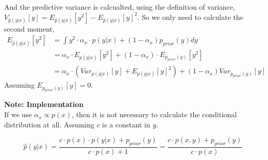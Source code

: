 And the predictive variance is calcualted, using the definition of variance, $V_{\hat p(y|x)}[y] =
E_{\hat p(y|x)}[y^2] - E_{\hat p(y|x)}[y]^2$. So we only need to calculate the second moment, 
\begin{align*}
    E_{\hat p(y|x)}[y^2] &= \int y^2 \cdot \alpha_x \cdot p(y|x) + (1-\alpha_x) p_{prior}(y) dy\\
    &=\alpha_x \cdot E_{p(y|x)}[y^2] +(1-\alpha_x) \cdot E_{p_{prior}(y)}[y^2] \\
    &=\alpha_x \cdot(Var_{p(y|x)}[y]+E_{p(y|x)}[y]^2) + (1-\alpha_x) Var_{p_{prior}(y)}[y]
\end{align*}
Assuming $E_{p_{prior}(y)}[y] = 0$. 

\begin{tcolorbox}[
    sharp corners,
    boxrule=0mm,
    enhanced,
    borderline west={4pt}{0pt}{gray},
    colframe=drGray,
    colback=drGray,
    coltitle=black,
]
{\large \textbf{Note: Implementation}}\\
    If we use $\alpha_x \propto p(x)$, then it is not necessary to calculate the conditional
    distribution at all. Assuming $c$ is a constant in $y$. 

    $$\hat p(y|x) = \frac{c\cdot p(x)\cdot  p(y|x) + p_{prior}(y)}{c\cdot p(x)+1} = \frac{c \cdot p(x,y) + p_{prior}(y)}{c\cdot p(x)}$$
\end{tcolorbox}

